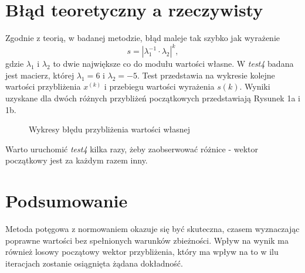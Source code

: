 \documentclass[a4paper,12pt]{article}
\begin{document}
\section*{Błąd teoretyczny a rzeczywisty}
Zgodnie z teorią, w badanej metodzie, błąd maleje tak szybko jak wyrażenie
\[ s =|\lambda_1^{-1} \cdot \lambda_2|^k ,\]
gdzie $\lambda_1$ i $\lambda_2$ to dwie największe co do modułu wartości własne. W \emph{test4} badana jest macierz, której $ \lambda_1  = 6$ i $\lambda_2 = -5$. Test przedstawia na wykresie kolejne wartości przybliżenia $x^{(k)}$ i przebiegu wartości wyrażenia $s(k)$. Wyniki uzyskane dla dwóch różnych przybliżeń początkowych przedstawiają Rysunek 1a i 1b.
\begin{figure}[H]%
    \centering
    \qquad
  \footnotesize \caption{Wykresy błędu przybliżenia wartości własnej } %
    \label{fig:example}%
\end{figure}
\vspace{-6mm}%
Warto uruchomić \emph{test4} kilka razy, żeby zaobserwować różnice - wektor początkowy jest za każdym razem inny.

\section*{Podsumowanie}
Metoda potęgowa z normowaniem okazuje się być skuteczna, czasem wyznaczając poprawne wartości bez spełnionych warunków zbieżności. Wpływ na wynik ma również losowy początowy wektor przybliżenia, który ma wpływ na to w ilu iteracjach zostanie osiągnięta żądana dokładność.
\end{document}
